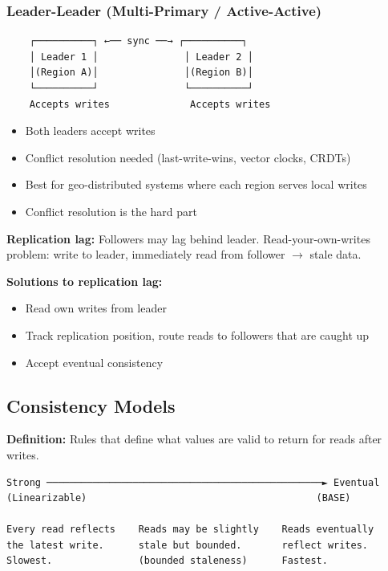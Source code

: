 \documentclass[11pt]{article}
\providecommand{\tightlist}{\setlength{\itemsep}{1pt}\setlength{\parskip}{0pt}}
\begin{document}
\subsubsection{Leader-Leader (Multi-Primary / Active-Active)}\label{leader-leader-multi-primary--active-active}

\setcodelang{}

\begin{verbatim}
    ┌──────────┐ ←── sync ──→ ┌──────────┐
    │ Leader 1 │               │ Leader 2 │
    │(Region A)│               │(Region B)│
    └──────────┘               └──────────┘
    Accepts writes              Accepts writes
\end{verbatim}

\begin{itemize}
\tightlist
\item
  Both leaders accept writes
\item
  Conflict resolution needed (last-write-wins, vector clocks, CRDTs)
\item
  Best for geo-distributed systems where each region serves local writes
\item
  Conflict resolution is the hard part
\end{itemize}

\textbf{Replication lag:} Followers may lag behind leader. Read-your-own-writes problem: write to leader, immediately read from follower \(\rightarrow\) stale data.

\textbf{Solutions to replication lag:}

\begin{itemize}
\tightlist
\item
  Read own writes from leader
\item
  Track replication position, route reads to followers that are caught up
\item
  Accept eventual consistency
\end{itemize}

\subsection{Consistency Models}\label{consistency-models}

\textbf{Definition:} Rules that define what values are valid to return for reads after writes.

\setcodelang{}

\begin{verbatim}
Strong ────────────────────────────────────────────────► Eventual
(Linearizable)                                        (BASE)

Every read reflects    Reads may be slightly    Reads eventually
the latest write.      stale but bounded.       reflect writes.
Slowest.               (bounded staleness)      Fastest.
\end{verbatim}
\end{document}
